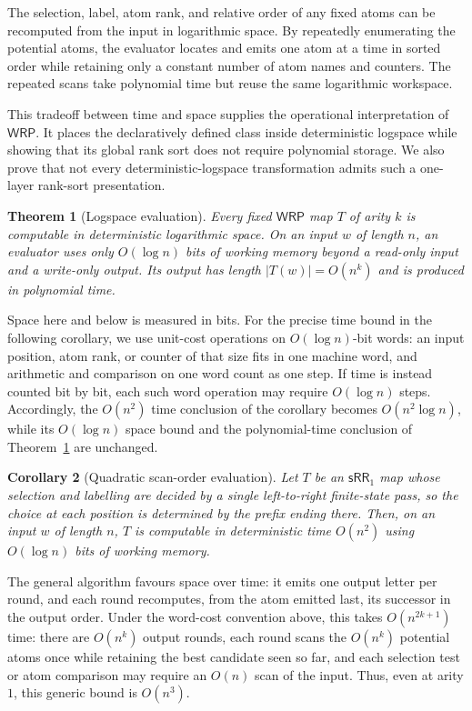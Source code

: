 \documentclass[11pt]{article}
\newtheorem{theorem}{Theorem}[section]
\newtheorem{corollary}[theorem]{Corollary}
\theoremstyle{definition}
\newcommand{\WRP}{\mathsf{WRP}}
\newcommand{\SWR}{\mathsf{sRR}_1}
\begin{document}
The selection, label, atom rank, and relative order of any fixed atoms can be
recomputed from the input in logarithmic space.  By repeatedly enumerating the
potential atoms, the evaluator locates and emits one atom at a time in sorted
order while retaining only a constant number of atom names and counters.  The
repeated scans take polynomial time but reuse the same logarithmic workspace.

This tradeoff between time and space supplies the operational interpretation
of $\WRP$.  It places the declaratively defined class inside deterministic
logspace while showing that its global rank sort does not require polynomial
storage.  We also prove that not every deterministic-logspace transformation
admits such a one-layer rank-sort presentation.

\begin{theorem}[Logspace evaluation]\label{thm:wrp-logspace}
Every fixed $\WRP$ map $T$ of arity $k$ is computable in deterministic
\emph{logarithmic space}.  On an input $w$ of length $n$, an evaluator uses
only $O(\log n)$ bits of working memory beyond a read-only input and a
write-only output.  Its output has length $|T(w)|=O(n^k)$ and is produced in
polynomial time.
\end{theorem}

Space here and below is measured in bits.  For the precise time bound in the
following corollary, we use unit-cost operations on $O(\log n)$-bit words: an
input position, atom rank, or counter of that size fits in one machine word, and
arithmetic and comparison on one word count as one step.  If time is instead
counted bit by bit, each such word operation may require $O(\log n)$ steps.
Accordingly, the $O(n^2)$ time conclusion of the corollary becomes
$O(n^2\log n)$, while its $O(\log n)$ space bound and the polynomial-time
conclusion of Theorem~\ref{thm:wrp-logspace} are unchanged.

\begin{corollary}[Quadratic scan-order evaluation]
\label{cor:srr-quadratic}
Let $T$ be an $\SWR$ map whose selection and labelling are decided by a
single left-to-right finite-state pass, so the choice at each position is
determined by the prefix ending there.  Then, on an input $w$ of length $n$,
$T$ is computable in deterministic time $O(n^2)$ using $O(\log n)$ bits of
working memory.
\end{corollary}

The general algorithm favours space over time: it emits one output letter per
round, and each round recomputes, from the atom emitted last, its successor in
the output order.  Under the word-cost convention above, this takes
$O(n^{2k+1})$ time: there are $O(n^k)$ output rounds, each round scans the
$O(n^k)$ potential atoms once while retaining the best candidate seen so far,
and each selection test or atom comparison may require an $O(n)$ scan of the
input.  Thus, even at arity $1$, this generic bound is $O(n^3)$.
\end{document}
